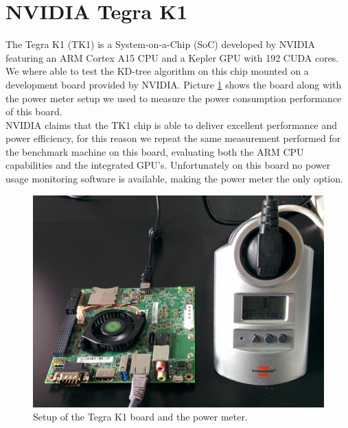 \section{NVIDIA Tegra K1}
The Tegra K1 (TK1) is a System-on-a-Chip (SoC) developed by NVIDIA featuring an ARM Cortex A15 CPU and a Kepler GPU with 192 CUDA cores.  We where able to test the KD-tree algorithm on this chip mounted on a development board provided by NVIDIA. Picture \ref{tk1_photo} shows the board along with the power meter setup we used to measure the power consumption performance of this board.\\
NVIDIA claims that the TK1 chip is able to deliver excellent performance and power efficiency, for this reason we repeat the same measurement performed for the benchmark machine on this board, evaluating both the ARM CPU capabilities and the integrated GPU's. Unfortunately on this board no power usage monitoring software is available, making the power meter the only option.

\begin{figure}
\includegraphics[width=\textwidth]{power/tk1.jpg}
\caption{Setup of the Tegra K1 board and the power meter.}
\label{tk1_photo}
\end{figure}

